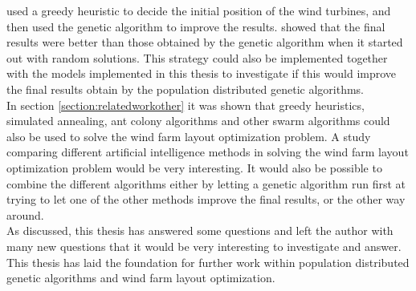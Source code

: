 \noindent \cite{Saavedra-Morena} used a greedy heuristic to decide the initial position of the wind turbines, and then used the genetic algorithm to improve the results. \cite{Saavedra-Morena} showed that the final results were better than those obtained by the genetic algorithm when it started out with random solutions. This strategy could also be implemented together with the models implemented in this thesis to investigate if this would improve the final results obtain by the population distributed genetic algorithms. \\


\noindent In section \ref{section:relatedworkother} it was shown that greedy heuristics, simulated annealing, ant colony algorithms and other swarm algorithms could also be used to solve the wind farm layout optimization problem. A study comparing different artificial intelligence methods in solving the wind farm layout optimization problem would be very interesting. It would also be possible to combine the different algorithms either by letting a genetic algorithm run first at trying to let one of the other methods improve the final results, or the other way around.\\

\noindent As discussed, this thesis has answered some questions and left the author with many new questions that it would be very interesting to investigate and answer. This thesis has laid the foundation for further work within population distributed genetic algorithms and wind farm layout optimization.\\